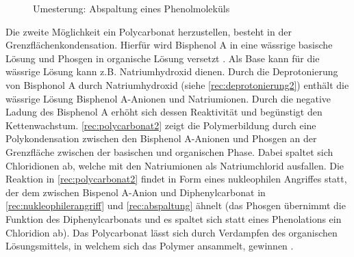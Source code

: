 \begin{figure}[H]
    \begin{center}
        \footnotesize
        \setatomsep{1.7em}


        \vspace{10pt}

        \chemrel{->}
        \chemnameinit{}
        \chemsign{+}

        \caption{Umesterung: Abspaltung eines Phenolmoleküls}
        \label{rec:abspaltung}
    \end{center}
\end{figure}

Die zweite Möglichkeit ein Polycarbonat herzustellen, besteht in der
Grenzflächenkondensation. Hierfür wird Bisphenol A in eine wässrige basische
Lösung und Phosgen in organische Lösung versetzt \cite{cuzpe}. Als Base kann für
die wässrige Lösung kann z.B. Natriumhydroxid dienen. Durch die Deprotonierung
von Bisphonol A durch Natriumhydroxid (siehe \autoref{rec:deprotonierung2})
enthält die wässrige Lösung Bisphenol A-Anionen und Natriumionen. Durch die
negative Ladung des Bisphenol A erhöht sich dessen Reaktivität und begünstigt
den Kettenwachstum. \autoref{rec:polycarbonat2} zeigt die Polymerbildung durch
eine Polykondensation zwischen den Bisphenol A-Anionen und Phosgen an der
Grenzfläche zwischen der basischen und organischen Phase. Dabei spaltet sich
Chloridionen ab, welche mit den Natriumionen als Natriumchlorid ausfallen. Die
Reaktion in \autoref{rec:polycarbonat2} findet in Form eines nukleophilen
Angriffes statt, der dem zwischen Bispenol A-Anion und Diphenylcarbonat in
\autoref{rec:nukleophilerangriff} und \autoref{rec:abspaltung} ähnelt (das
Phosgen übernimmt die Funktion des Diphenylcarbonats und es spaltet sich statt
eines Phenolations ein Chloridion ab). Das Polycarbonat lässt sich durch
Verdampfen des organischen Lösungsmittels, in welchem sich das Polymer
ansammelt, gewinnen \cite{garoo}.

